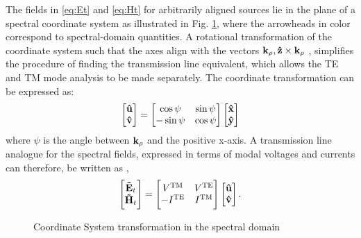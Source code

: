 The fields in \eqref{eq:Et} and  \eqref{eq:Ht} for arbitrarily aligned sources lie in the plane of a spectral coordinate system as illustrated in Fig. \ref{fig:SpCS}, where the arrowheads in color correspond to spectral-domain quantities. A rotational transformation of the coordinate system such that the axes align with the vectors $\mathbf{k}_{\rho}, \mathbf{\hat z} \times \mathbf{k}_{\rho}$ \cite{Itoh1980}, simplifies the procedure of finding the transmission line equivalent, which allows the TE and TM mode analysis to be made separately. The coordinate transformation can be expressed as:
%
\begin{equation}
  \begin{bmatrix}
    \mathbf{\hat u} \\
    \mathbf{\hat v}
  \end{bmatrix}
  =
  \begin{bmatrix}
    \cos \psi & \sin \psi \\
    -\sin \psi & \cos \psi
  \end{bmatrix}
  \begin{bmatrix}
    \mathbf{\hat x} \\
    \mathbf{\hat y}
  \end{bmatrix}
  \label{eq:transformation}
\end{equation}
%
where $\psi$ is the angle between $\mathbf{k_{\rho}}$ and the positive x-axis. A transmission line analogue for the spectral fields, expressed in terms of modal voltages and currents can therefore, be written as \cite{Kastner1988,Michalski1997},
%
\begin{equation}
  \begin{bmatrix}
    \mathbf{\tilde{E}}_t \\
    \mathbf{\tilde{H}}_t
  \end{bmatrix}
  =
  \begin{bmatrix}
    V^{\mathrm{TM}} & V^{\mathrm{TE}} \\
    -I^{\mathrm{\mathrm{TE}}} & I^{\mathrm{TM}}
  \end{bmatrix}
  \begin{bmatrix}
    \mathbf{\hat u} \\
    \mathbf{\hat v}
  \end{bmatrix}
  \label{eq:EHVI}.
\end{equation}
%
\begin{figure}[t!]
  \centering
  \def\svgwidth{.75\linewidth}
  
  \caption{Coordinate System transformation in the spectral domain}
  \label{fig:SpCS}
\end{figure}

